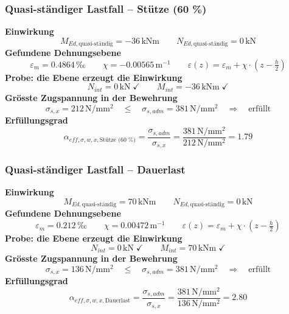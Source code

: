 \documentclass[11pt,a4paper]{article}
\begin{document}
\subsubsection{Quasi-ständiger Lastfall – Stütze (60 \%)}
\noindent\textbf{Einwirkung}
\begin{equation*}
M_{Ed,\text{quasi-ständig}} = -36\,\mathrm{kNm} \qquad N_{Ed,\text{quasi-ständig}} = 0\,\mathrm{kN}
\end{equation*}
\noindent\textbf{Gefundene Dehnungsebene}
\begin{equation*}
\varepsilon_m = 0.4864\,\text{‰} \qquad \chi = -0.00565\,\mathrm{m}^{-1} \qquad \varepsilon(z) = \varepsilon_m + \chi \cdot \left(z - \tfrac{h}{2}\right)
\end{equation*}
\noindent\textbf{Probe: die Ebene erzeugt die Einwirkung}
\begin{equation*}
N_{int} = 0\,\mathrm{kN} \;\checkmark \qquad M_{int} = -36\,\mathrm{kNm} \;\checkmark
\end{equation*}
\noindent\textbf{Grösste Zugspannung in der Bewehrung}
\begin{equation*}
\sigma_{s,x} = 212\,\mathrm{N}/\mathrm{mm}^{2} \quad \le \quad \sigma_{s,adm} = 381\,\mathrm{N}/\mathrm{mm}^{2} \quad \Rightarrow \quad \text{erfüllt}
\end{equation*}
\noindent\textbf{Erfüllungsgrad}
\begin{equation*}
\alpha_{eff,\sigma,w,x,\text{Stütze (60 \%)}} = \frac{\sigma_{s,adm}}{\sigma_{s,x}} = \frac{381\,\mathrm{N}/\mathrm{mm}^{2}}{212\,\mathrm{N}/\mathrm{mm}^{2}} = 1.79
\end{equation*}
\subsubsection{Quasi-ständiger Lastfall – Dauerlast}
\noindent\textbf{Einwirkung}
\begin{equation*}
M_{Ed,\text{quasi-ständig}} = 70\,\mathrm{kNm} \qquad N_{Ed,\text{quasi-ständig}} = 0\,\mathrm{kN}
\end{equation*}
\noindent\textbf{Gefundene Dehnungsebene}
\begin{equation*}
\varepsilon_m = 0.212\,\text{‰} \qquad \chi = 0.00472\,\mathrm{m}^{-1} \qquad \varepsilon(z) = \varepsilon_m + \chi \cdot \left(z - \tfrac{h}{2}\right)
\end{equation*}
\noindent\textbf{Probe: die Ebene erzeugt die Einwirkung}
\begin{equation*}
N_{int} = 0\,\mathrm{kN} \;\checkmark \qquad M_{int} = 70\,\mathrm{kNm} \;\checkmark
\end{equation*}
\noindent\textbf{Grösste Zugspannung in der Bewehrung}
\begin{equation*}
\sigma_{s,x} = 136\,\mathrm{N}/\mathrm{mm}^{2} \quad \le \quad \sigma_{s,adm} = 381\,\mathrm{N}/\mathrm{mm}^{2} \quad \Rightarrow \quad \text{erfüllt}
\end{equation*}
\noindent\textbf{Erfüllungsgrad}
\begin{equation*}
\alpha_{eff,\sigma,w,x,\text{Dauerlast}} = \frac{\sigma_{s,adm}}{\sigma_{s,x}} = \frac{381\,\mathrm{N}/\mathrm{mm}^{2}}{136\,\mathrm{N}/\mathrm{mm}^{2}} = 2.80
\end{equation*}
\end{document}
